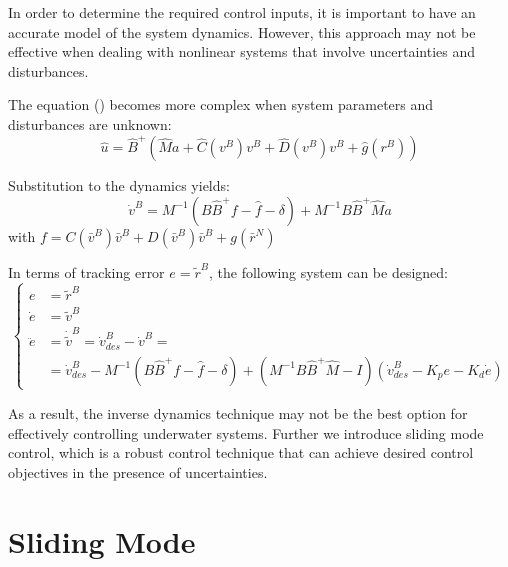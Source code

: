     In order to determine the required control inputs, it is important to have an accurate 
    model of the system dynamics. However, this approach may not be effective when dealing 
    with nonlinear systems that involve uncertainties and disturbances.

    The equation () becomes more complex when system parameters and disturbances are 
    unknown:
    $$
    \hat u = \hat{B}^{+}(\hat{M}a + \hat{C}(v^B)v^B + \hat{D}(v^B)v^B + 
    \hat{g}(r^B))
    $$

    Substitution to the dynamics yields:
    $$
    \dot{v}^B = M^{-1}(B\hat{B}^{+}f - \hat f - \delta) + 
    M^{-1}B\hat{B}^{+}\hat{M}a
    $$
    with $f = 
    C(\bar{v}^B) \bar{v}^B + D(\bar{v}^B) \bar{v}^B + g(\bar{r}^N)$

    In terms of tracking error $e = \tilde{r}^B$, the following system can 
    be designed:
    $$
    \begin{cases}
        e &= \tilde{r}^B \\
        \dot e &= \tilde{v}^B \\
        \ddot e &= \dot{\tilde{v}}^B = \dot{v}_{des}^B - \dot{v}^B = \\
        &= \dot{v}_{des}^B - M^{-1}(B\hat{B}^{+}f - \hat f - \delta) + 
    (M^{-1}B\hat{B}^{+}\hat{M} - I)(\dot{v}_{des}^B - K_pe - K_d \dot e)
    \end{cases}
    $$



    As a result, the inverse dynamics technique may not be the best option for effectively 
    controlling underwater systems. Further we introduce sliding mode control, which is a robust 
    control technique that can achieve desired control objectives in the presence of uncertainties.

\section{Sliding Mode}

